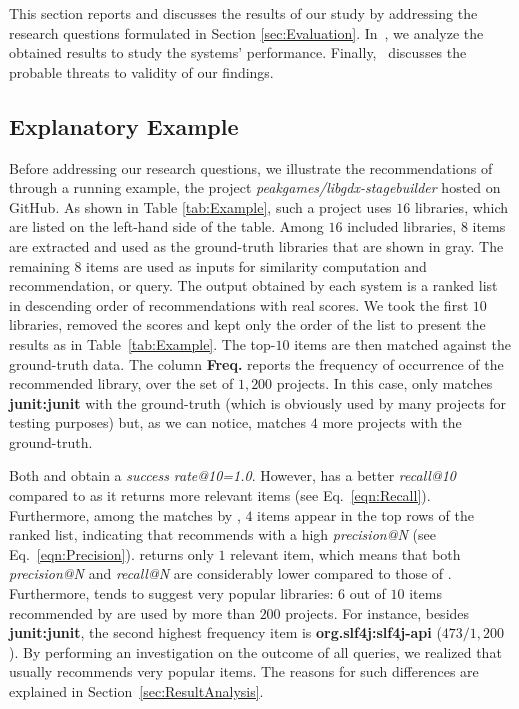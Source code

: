 This section reports and discusses the results of our study by addressing the research questions formulated in Section \ref{sec:Evaluation}.  In~, we analyze the obtained results to study the systems' performance. Finally,~ discusses the probable threats to validity of our findings. 



\subsection{Explanatory Example} \label{sec:Example}
Before addressing our research questions, we illustrate the recommendations of \CR through a running example, \ie the project  \textit{peakgames/libgdx-stagebuilder}  hosted on GitHub.
As shown in Table \ref{tab:Example}, such a project uses $16$ libraries, which are listed on the left-hand side of the table. Among $16$ included libraries, $8$ items are extracted and used as the ground-truth libraries that are shown in gray. The remaining $8$ items are used as inputs for similarity computation and recommendation, or query. The output obtained by each system is a ranked list in descending order of recommendations with real scores. We took the first $10$ libraries, removed the scores and kept only the order of the list to present the results as in Table~\ref{tab:Example}. The top-$10$ items are then matched against the ground-truth data. 
The column \textbf{Freq.} reports the frequency of occurrence of the 
recommended library, over the set of $1,200$ projects. In this case, \LR 
only matches \textbf{junit:junit} with the ground-truth (which is obviously used 
by many projects for testing purposes) but, as we can notice, \CR 
matches $4$ more projects with the ground-truth. %



Both \LR and \CR obtain a \emph{success rate@10=1.0}. However, \CR has a better \emph{recall@10} compared to \LR as it returns more relevant items (see Eq.~\eqref{eqn:Recall}). Furthermore, among the matches by \CR, $4$ items appear in the top rows of the ranked list, indicating that \CR recommends with a high \emph{precision@N} (see Eq.~\eqref{eqn:Precision}). \LR returns only $1$ relevant item, which means that both \emph{precision@N} and \emph{recall@N} are considerably lower compared to those of \CR. Furthermore, \LR tends to suggest very popular libraries: $6$ out of $10$ items recommended by \LR are used by more than $200$ projects. For instance, besides \textbf{junit:junit}, the second highest frequency item is \textbf{org.slf4j:slf4j-api} ($473/1,200$). By performing an investigation on the outcome of all queries, we realized that \LR usually recommends very popular items. The reasons for such differences are explained in Section~\ref{sec:ResultAnalysis}.

